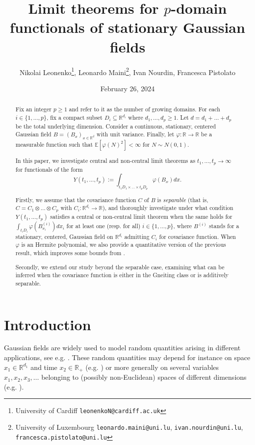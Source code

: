 \documentclass[12pt]{article}
\title{Limit theorems for $p$-domain functionals of stationary Gaussian fields}
\author{Nikolai Leonenko\footnote{University of Cardiff \texttt{leonenkoN@cardiff.ac.uk}}, Leonardo Maini\footnote{University of Luxembourg \texttt{leonardo.maini@uni.lu},  \texttt{ivan.nourdin@uni.lu}, \texttt{francesca.pistolato@uni.lu}}, Ivan Nourdin\footnotemark[2], Francesca Pistolato\footnotemark[2]}
\date{February 26, 2024}
\DeclareMathOperator{\1}{1}
\newcommand{\R}{\mathbb{R}}
\newcommand{\E}{\mathbb{E}}
\theoremstyle{plain}
\theoremstyle{definition}
\begin{document}
\maketitle

\begin{abstract}
    Fix an integer $p\geq 1$ and refer to it as the number of growing domains. 
    For each $i\in\{1,\ldots,p\}$, fix a compact subset $D_i\subseteq\R^{d_i}$ where 
    $d_1,\ldots,d_p\ge 1$. Let $d= d_1+\dots+d_{p}$ be the total underlying dimension. Consider a continuous, stationary, centered Gaussian field $B=(B_x)_{x\in \R^d}$ with unit variance. Finally, let $\varphi:\R \rightarrow \R$ be a measurable function such that $\E[\varphi(N)^2]<\infty$ for $N\sim N(0,1)$. 
    
    In this paper, we investigate central and non-central limit theorems as $t_1,\ldots,t_p\to\infty$ for functionals of the form
    \[
    Y(t_1,\dots,t_p):=\int_{t_1D_1\times\dots \times t_pD_p}\varphi(B_{x})dx.
    \]

Firstly, we assume that the covariance function $C$ of $B$ is {\it separable} (that is, $C=C_1\otimes\ldots\otimes C_{p}$ with $C_i:\R^{d_i}\to\R$), and thoroughly investigate under what condition 
    $Y(t_1,\dots,t_p)$ satisfies a central or non-central limit theorem when the same holds for $\int_{t_iD_i}\varphi(B^{(i)}_{x_i})dx_i$ for at least one (resp. for all) $i\in \{1,\ldots,p\}$, where
    $B^{(i)}$ stands for a stationary, centered, Gaussian field on $\R^{d_i}$ admitting $C_i$ for covariance function.
    When $\varphi$ is an Hermite polynomial, we also provide a quantitative version of the previous result, which improves some bounds from \cite{RST}. 

Secondly, we extend our study beyond the separable case, examining what can be inferred when the covariance function is either in the Gneiting class or is additively separable.
    
\end{abstract}

\section{Introduction}

Gaussian fields are widely used to model random quantities arising in different applications, see e.g. \cite{LRM23, Diggle2007, G02, Christakos1992RandomFM}. These random quantities may depend for instance on space $x_1\in\R^{d_1}$ and time $x_2\in\R_+$ (e.g. \cite{G02}) or more generally on several variables $x_1,x_2,x_3,\dots$ belonging to (possibly non-Euclidean) spaces of different dimensions (e.g. \cite{porcu1motivation, MRV21MotivNonUni,marinucci2022fluctuations}). 
\end{document}
